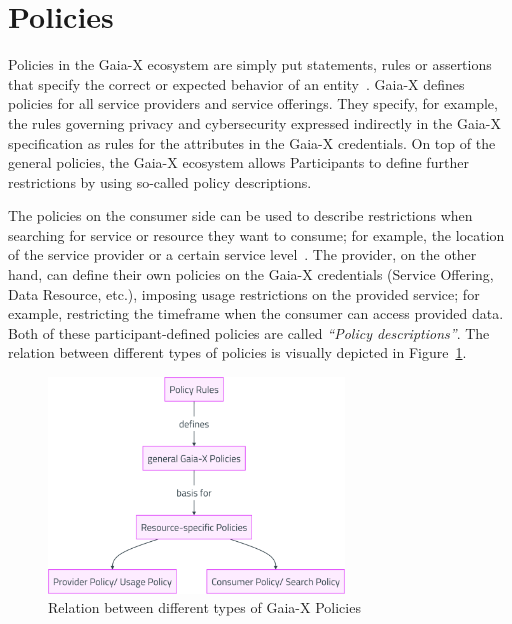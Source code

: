 \section{Policies}\label{sec:policies}

Policies in the Gaia-X ecosystem are simply put statements, rules or assertions that specify the correct or expected behavior of an entity~\cite{gaiax_architecture_document}.
Gaia-X defines policies for all service providers and service offerings.
They specify, for example, the rules governing privacy and cybersecurity expressed indirectly in the Gaia-X specification as rules for the attributes in the Gaia-X credentials.
On top of the general policies, the Gaia-X ecosystem allows Participants to define further restrictions by using so-called policy descriptions.

The policies on the consumer side can be used to describe restrictions when searching for service or resource they want to consume; for example, the location of the service provider or a certain service level~\cite{gaiax_architecture_document}.
The provider, on the other hand, can define their own policies on the Gaia-X credentials (Service Offering, Data Resource, etc.), imposing usage restrictions on the provided service; for example, restricting the timeframe when the consumer can access provided data.
Both of these participant-defined policies are called \textit{``Policy descriptions''}.
The relation between different types of policies is visually depicted in Figure~\ref{fig:gaiax_policies}.

\begin{figure}
    \centering
    \includegraphics[width=0.7\textwidth]{figures/policies.png}
    \caption{Relation between different types of Gaia-X Policies~\cite{gaiax_architecture_document}}\label{fig:gaiax_policies}
\end{figure}

